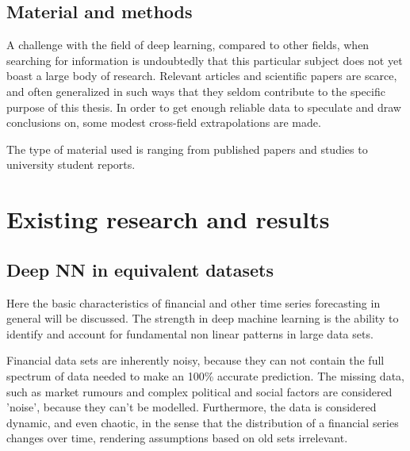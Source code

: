 \subsection{Material and methods}


A challenge with the field of deep learning, compared to other fields, when searching for information is undoubtedly that this particular subject does not yet boast a large body of research. Relevant articles and scientific papers are scarce, and often generalized in such ways that they seldom contribute to the specific purpose of this thesis. In order to get enough reliable data to speculate and draw conclusions on, some modest cross-field extrapolations are made.

The type of material used is ranging from published papers and studies to university student reports.



\newpage

\section{Existing research and results}
\subsection{Deep NN in equivalent datasets}

Here the basic characteristics of financial and other time series forecasting in general will be discussed.
The strength in deep machine learning is the ability to identify and account for fundamental non linear patterns in large data sets.

Financial data sets are inherently noisy, because they can not contain the full spectrum of data needed to make an 100\% accurate prediction. The missing data, such as market rumours and complex political and social factors are considered 'noise', because they can't be modelled. Furthermore, the data is considered dynamic, and even chaotic, in the sense that the distribution of a financial series changes over time, rendering assumptions based on old sets irrelevant. 

